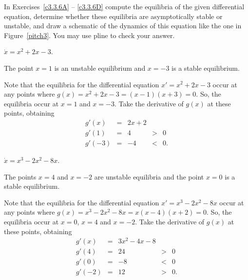\documentclass{ximera}
\begin{document}
\noindent In Exercises~\ref{c3.3.6A} -- \ref{c3.3.6D} compute the equilibria 
of the given differential equation, determine whether these equilibria are 
asymptotically stable or unstable, and draw a sche\-ma\-tic of the dynamics 
of this equation like the one in Figure~\ref{pitch3}.  You may use {\sf pline}
to check your answer.
\begin{exercise} \label{c3.3.6A}
$\dot{x} = x^2 + 2x - 3$.

\begin{solution}

\ans The point $x = 1$ is an unstable equilibrium and $x = -3$ is a stable
equilibrium.

\soln Note that the equilibria for the differential equation
$x' = x^2 + 2x - 3$ occur at any points where
$g(x) = x^2 + 2x - 3 = (x - 1)(x + 3) = 0$.
So, the equilibria occur at $x = 1$ and $x = -3$.  Take the
derivative of $g(x)$ at these points, obtaining
\[
\begin{array}{rcccl}
g'(x) & = & 2x + 2 \\
g'(1) & = & 4 & > & 0 \\
g'(-3) & = & -4 & < & 0.\end{array}
\]


\end{solution}
\end{exercise}
\begin{exercise} \label{c3.3.6B}
$\dot{x} = x^3 - 2x^2 - 8x$.

\begin{solution}

\ans The points $x=4$ and $x = -2$ are unstable equilibria and the point 
$x = 0$ is a stable equilibrium.

\soln Note that the equilibria for the differential equation
$x' = x^3 - 2x^2 - 8x$ occur at any points where
$g(x) = x^3 - 2x^2 - 8x = x(x - 4)(x + 2) = 0$.
So, the equilibria occur at $x=0$, $x = 4$ and $x = -2$.  Take the
derivative of $g(x)$ at these points, obtaining
\[
\begin{array}{rcccl}
g'(x) & = & 3x^2-4x-8 \\
g'(4) & = & 24 & > & 0 \\
g'(0) & = & -8 & < & 0\\
g'(-2) & = & 12 & > & 0.\end{array}
\]

\end{solution}
\end{exercise}
\end{document}
